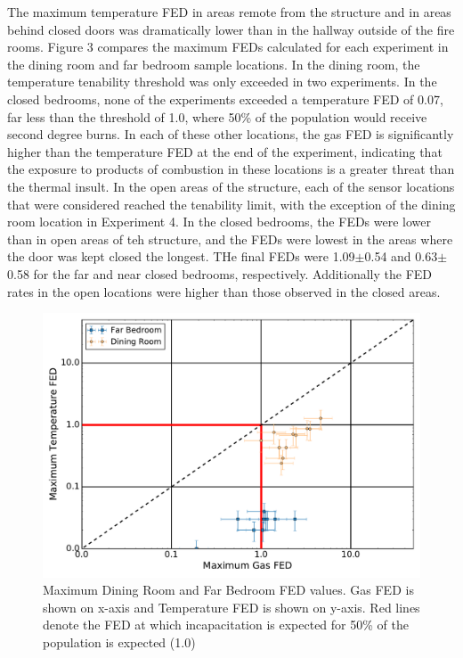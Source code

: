 \documentclass[12pt,oneside]{article}
\begin{document}
The maximum temperature FED in areas remote from the structure and in areas behind closed doors was dramatically lower than in the hallway outside of the fire rooms. Figure 3 compares the maximum FEDs calculated for each experiment in the dining room and far bedroom sample locations. In the dining room, the temperature tenability threshold was only exceeded in two experiments. In the closed bedrooms, none of the experiments exceeded a temperature FED of 0.07, far less than the threshold of 1.0, where 50\% of the population would receive second degree burns. In each of these other locations, the gas FED is significantly higher than the temperature FED at the end of the experiment, indicating that the exposure to products of combustion in these locations is a greater threat than the thermal insult. In the open areas of the structure, each of the sensor locations that were considered reached the tenability limit, with the exception of the dining room location in Experiment 4. In the closed bedrooms, the FEDs were lower than in open areas of teh structure, and the FEDs were lowest in the areas where the door was kept closed the longest. THe final FEDs were 1.09$\pm$0.54 and 0.63$\pm$0.58 for the far and near closed bedrooms, respectively. Additionally the FED rates in the open locations were higher than those observed in the closed areas.
\begin{figure}[!ht]
	\centering
	\includegraphics[width=.75\textwidth]{../Figures/br_compare/Far}
	\caption[Maximum Dining Room and Far Bedroom FED values]{Maximum Dining Room and Far Bedroom FED values. Gas FED is shown on x-axis and Temperature FED is shown on y-axis. Red lines denote the FED at which incapacitation is expected for 50\% of the population is expected (1.0)}
	\label{fig:far_FED_compare}
\end{figure}

\end{document}
